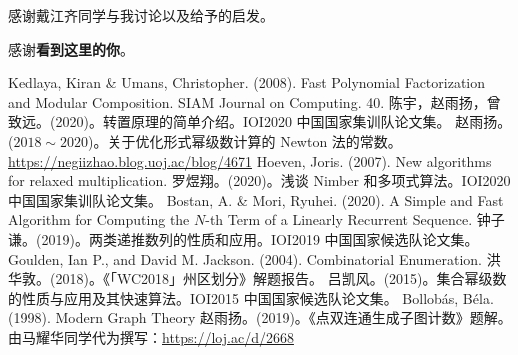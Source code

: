 感谢戴江齐同学与我讨论以及给予的启发。

\ifcont
感谢\textbf{看{\color{red}到这里的你}}。
\fi

\begin{thebibliography}{99}
\ifcont
{}
\fi
{} Kedlaya, Kiran \& Umans, Christopher. (2008). Fast Polynomial Factorization and Modular Composition. SIAM Journal on Computing. 40. 
 陈宇，赵雨扬，曾致远。(2020)。转置原理的简单介绍。IOI2020 中国国家集训队论文集。
 赵雨扬。($2018\sim 2020$)。关于优化形式幂级数计算的 Newton 法的常数。\url{https://negiizhao.blog.uoj.ac/blog/4671}
 Hoeven, Joris. (2007). New algorithms for relaxed multiplication.  
 罗煜翔。(2020)。浅谈 Nimber 和多项式算法。IOI2020 中国国家集训队论文集。
 Bostan, A. \& Mori, Ryuhei. (2020). A Simple and Fast Algorithm for Computing the $N$-th Term of a Linearly Recurrent Sequence. 
 钟子谦。(2019)。两类递推数列的性质和应用。IOI2019 中国国家候选队论文集。
 Goulden, Ian P., and David M. Jackson. (2004). Combinatorial Enumeration.
 洪华敦。(2018)。《「WC2018」州区划分》解题报告。
 吕凯风。(2015)。集合幂级数的性质与应用及其快速算法。IOI2015 中国国家候选队论文集。
 Bollob\'as, B\'ela. (1998). Modern Graph Theory
 赵雨扬。(2019)。《点双连通生成子图计数》题解。由马耀华同学代为撰写：\url{https://loj.ac/d/2668}
\end{thebibliography}
